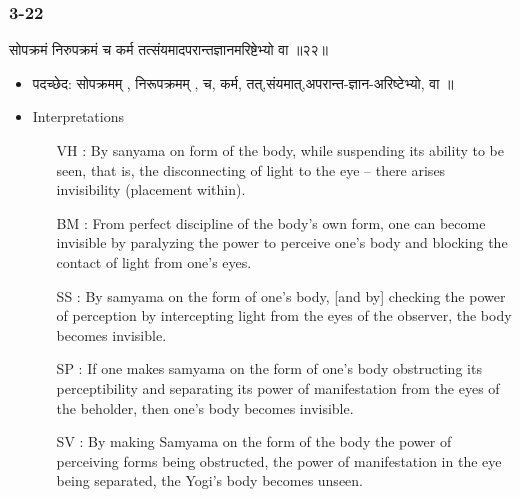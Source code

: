 \begin{frame}[fragile]\frametitle{3-22}
\begin{sanskrit}
सोपक्रमं निरुपक्रमं च कर्म तत्संयमादपरान्तज्ञानमरिष्टेभ्यो वा ॥२२॥
\end{sanskrit}

	\begin{itemize}
	\item पदच्छेद:  सोपक्रमम् , निरूपक्रमम् , च, कर्म, तत्,संयमात्,अपरान्त-ज्ञान-अरिष्टेभ्यो, वा ॥
	\item Interpretations
		\begin{itemize}	
		\item [VH]: By sanyama on form of the body, while suspending its ability to be seen, that is, the disconnecting of light to the eye – there arises invisibility (placement within).
		\item [BM]: From perfect discipline of the body’s own form, one can become invisible by paralyzing the power to perceive one’s body and blocking the contact of light from one’s eyes.
		\item [SS]: By samyama on the form of one’s body, [and by] checking the power of perception by intercepting light from the eyes of the observer, the body becomes invisible.
		\item [SP]: If one makes samyama on the form of one’s body obstructing its perceptibility and separating its power of manifestation from the eyes of the beholder, then one’s body becomes invisible.
		\item [SV]: By making Samyama on the form of the body the power of perceiving forms being obstructed, the power of manifestation in the eye being separated, the Yogi’s body becomes unseen. 
		\end{itemize}
	\end{itemize}
\end{frame}

